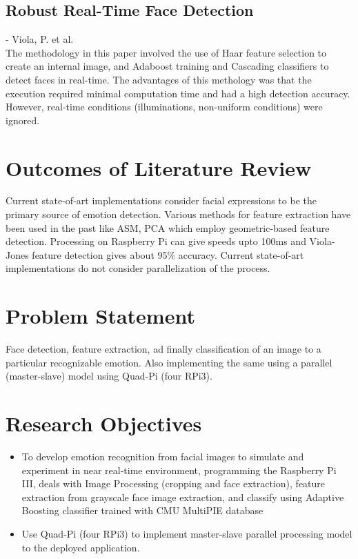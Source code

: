 \subsection{Robust Real-Time Face Detection}
- Viola, P. et al. \cite{viola2004} \\
The methodology in this paper involved the use of Haar feature selection to create an internal image, and Adaboost training and Cascading classifiers to detect faces in real-time. The advantages of this methology was that the execution required minimal computation time and had a high detection accuracy. However, real-time conditions (illuminations, non-uniform conditions) were ignored.

\section{Outcomes of Literature Review}
Current state-of-art implementations consider facial expressions to be the primary source of emotion detection. Various methods for feature extraction have been used in the past like ASM, PCA which employ geometric-based feature detection. Processing on Raspberry Pi can give speeds upto 100ms and Viola-Jones feature detection gives about 95\% accuracy. Current state-of-art implementations do not consider parallelization of the process. 

\section{Problem Statement}
Face detection, feature extraction, ad finally classification of an image to a particular recognizable emotion. Also implementing the same using a parallel (master-slave) model using Quad-Pi (four RPi3).

\section{Research Objectives}
\begin{itemize}
\item To develop emotion recognition from facial images to simulate and experiment in near real-time environment, programming the Raspberry Pi III, deals with Image Processing (cropping and face extraction), feature extraction from grayscale face image extraction, and classify using Adaptive Boosting classifier trained with CMU MultiPIE database
\item Use Quad-Pi (four RPi3) to implement master-slave parallel processing model to the deployed application.
\end{itemize}
